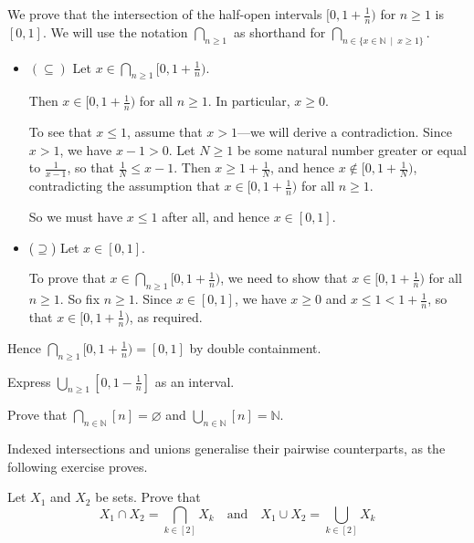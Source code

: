 \begin{example}
\label{exIndexedIntersectionOfHalfOpenIntervals}
We prove that the intersection of the half-open intervals $[0,1+\frac{1}{n})$ for $n \ge 1$ is $[0,1]$. We will use the notation $\displaystyle \bigcap_{n \ge 1}$ as shorthand for $\displaystyle \bigcap_{n \in \{ x \in \mathbb{N} ~\mid~ x \ge 1 \}}$.

\begin{itemize}
\item $(\subseteq)$ Let $x \in \displaystyle\bigcap_{n \ge 1} [0,1+\frac{1}{n})$.

Then $x \in [0,1+\frac{1}{n})$ for all $n \ge 1$. In particular, $x \ge 0$.

To see that $x \le 1$, assume that $x>1$---we will derive a contradiction. Since $x>1$, we have $x-1 > 0$. Let $N \ge 1$ be some natural number greater or equal to $\frac{1}{x-1}$, so that $\frac{1}{N} \le x-1$. Then $x \ge 1 + \frac{1}{N}$, and hence $x \not\in [0,1+\frac{1}{N})$, contradicting the assumption that $x \in [0,1+\frac{1}{n})$ for all $n \ge 1$.

So we must have $x \le 1$ after all, and hence $x \in [0,1]$.

\item ($\supseteq$) Let $x \in [0,1]$.

To prove that $x \in \displaystyle \bigcap_{n \ge 1} [0,1+\frac{1}{n})$, we need to show that $x \in [0,1+\frac{1}{n})$ for all $n \ge 1$. So fix $n \ge 1$. Since $x \in [0,1]$, we have $x \ge 0$ and $x \le 1 < 1+\frac{1}{n}$, so that $x \in [0,1+\frac{1}{n})$, as required.
\end{itemize}

Hence $\displaystyle\bigcap_{n \ge 1} [0,1+\frac{1}{n}) = [0,1]$ by double containment.
\end{example}

\begin{exercise}
Express $\displaystyle\bigcup_{n \ge 1} [0,1-\frac{1}{n}]$ as an interval.
\end{exercise}

\begin{exercise}
Prove that $\displaystyle\bigcap_{n \in \mathbb{N}} [n] = \varnothing$ and $\displaystyle\bigcup_{n \in \mathbb{N}} [n] = \mathbb{N}$.
\end{exercise}

Indexed intersections and unions generalise their pairwise counterparts, as the following exercise proves.

\begin{exercise}
\label{exIndexedIntersectionUnionGeneralisePairwise}
Let $X_1$ and $X_2$ be sets. Prove that
\[ X_1 \cap X_2 = \bigcap_{k \in [2]} X_k \quad \text{and} \quad X_1 \cup X_2 = \bigcup_{k \in [2]} X_k \]
\end{exercise}

